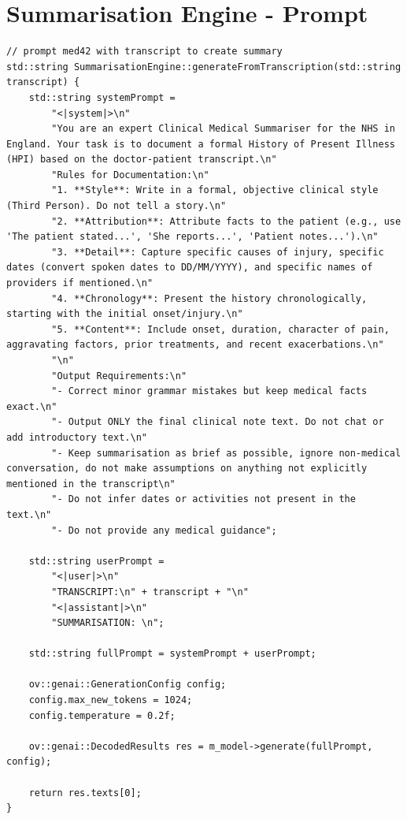 \chapter{Summarisation Engine - Prompt}
\label{app:prompt}

\begin{verbatim}
// prompt med42 with transcript to create summary
std::string SummarisationEngine::generateFromTranscription(std::string transcript) {
    std::string systemPrompt =
        "<|system|>\n"
        "You are an expert Clinical Medical Summariser for the NHS in England. Your task is to document a formal History of Present Illness (HPI) based on the doctor-patient transcript.\n"
        "Rules for Documentation:\n"
        "1. **Style**: Write in a formal, objective clinical style (Third Person). Do not tell a story.\n"
        "2. **Attribution**: Attribute facts to the patient (e.g., use 'The patient stated...', 'She reports...', 'Patient notes...').\n"
        "3. **Detail**: Capture specific causes of injury, specific dates (convert spoken dates to DD/MM/YYYY), and specific names of providers if mentioned.\n"
        "4. **Chronology**: Present the history chronologically, starting with the initial onset/injury.\n"
        "5. **Content**: Include onset, duration, character of pain, aggravating factors, prior treatments, and recent exacerbations.\n"
        "\n"
        "Output Requirements:\n"
        "- Correct minor grammar mistakes but keep medical facts exact.\n"
        "- Output ONLY the final clinical note text. Do not chat or add introductory text.\n"
        "- Keep summarisation as brief as possible, ignore non-medical conversation, do not make assumptions on anything not explicitly mentioned in the transcript\n"
        "- Do not infer dates or activities not present in the text.\n"
        "- Do not provide any medical guidance";

    std::string userPrompt =
        "<|user|>\n"
        "TRANSCRIPT:\n" + transcript + "\n"
        "<|assistant|>\n"
        "SUMMARISATION: \n";

    std::string fullPrompt = systemPrompt + userPrompt;

    ov::genai::GenerationConfig config;
    config.max_new_tokens = 1024; 
    config.temperature = 0.2f;   

    ov::genai::DecodedResults res = m_model->generate(fullPrompt, config);

    return res.texts[0];
}
\end{verbatim}